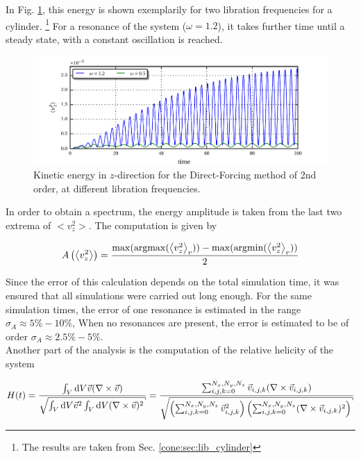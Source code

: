 In Fig. \ref{fig:cone:cyl_vzmode}, this energy is shown exemplarily for two libration frequencies for a cylinder.
\footnote{The results are taken from Sec. \ref{cone:sec:lib_cylinder}}
For a resonance of the system ($\omega=1.2$), it takes further time until a steady state, with a constant oscillation is reached.

\begin{figure}[!pb]
  \includegraphics{gfx/cone/cylinder/cyl_vz.pdf}
  \caption{Kinetic energy in $z$-direction for the Direct-Forcing method of 2nd order, at different libration frequencies.
  \label{fig:cone:cyl_vzmode}
  }
\end{figure}
\clearpage

In order to obtain a spectrum, the energy amplitude is taken from the last two extrema of $<v_z^2>$.
The computation is given by

\begin{align}
    A\left(\left<v_z^2\right>\right) = \frac{\max(\operatorname*{argmax}(\left<v_z^2\right>_{v})) - \max(\operatorname*{argmin}(\left<v_z^2\right>_{v}))}{2}
\end{align}

Since the error of this calculation depends on the total simulation time, it was ensured that all simulations
were carried out long enough.
For the same simulation times, the error of one resonance is estimated in the range $\sigma_A \approx 5\% - 10\%$,
When no resonances are present, the error is estimated to be of order $\sigma_A \approx 2.5\% - 5\%$.\\
Another part of the analysis is the computation of the relative helicity of the system

\begin{align}
H(t) = \frac{\int_V \dif V \vec{v} (\nabla \times \vec{v})}
{\sqrt{\int_V \dif V \vec{v}^2 \int_V \dif V (\nabla \times \vec{v})^2}}
 = \frac{\sum_{i,j,k=0}^{N_x, N_y, N_z} \vec{v}_{i,j,k} (\nabla \times \vec{v}_{i, j, k})}
 {\sqrt{\left(\sum_{i,j,k=0}^{N_x, N_y, N_z}\vec{v}_{i,j,k}^2\right)
 \left(\sum_{i,j,k=0}^{N_x, N_y, N_z}
  (\nabla \times \vec{v}_{i, j, k})^2\right)}}
\end{align}

